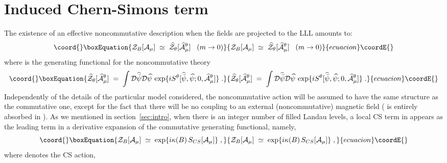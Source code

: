 \documentclass[a4paper,12pt]{article}
\begin{document}
\section{Induced Chern-Simons term}\label{sec:ics}
The existence of an effective noncommutative description when the
fields are projected to the LLL amounts to:
\begin{equation}\coord{}\boxEquation{
  \label{eq:zs}
  {\mathcal Z}_B[{\mathcal A}_\mu] \;\simeq\; 
\widehat{\mathcal Z}_\theta[{\widehat {\mathcal A}}^\theta_\mu] \;\;\;(m \to 0)  
}{
  {\mathcal Z}_B[{\mathcal A}_\mu] \;\simeq\; 
\widehat{\mathcal Z}_\theta[{\widehat {\mathcal A}}^\theta_\mu] \;\;\;(m \to 0)  
}{ecuacion}\coordE{}\end{equation}
where \coordHE{} is the
generating functional for the noncommutative theory 
\begin{equation}\coord{}\boxEquation{
  \label{eq:zncomm}
  \widehat{\mathcal Z}_\theta[{\widehat {\mathcal A}}^\theta_\mu]\;=\; 
\int {\mathcal D}{\widehat {\bar \psi}}
{\mathcal D}{\widehat \psi} \, \exp \{i S^\theta[{\widehat{\bar \psi}},
{\widehat \psi};0,{\widehat {\mathcal A}}^\theta_\mu] \}     \;.
}{
  \widehat{\mathcal Z}_\theta[{\widehat {\mathcal A}}^\theta_\mu]\;=\; 
\int {\mathcal D}{\widehat {\bar \psi}}
{\mathcal D}{\widehat \psi} \, \exp \{i S^\theta[{\widehat{\bar \psi}},
{\widehat \psi};0,{\widehat {\mathcal A}}^\theta_\mu] \}     \;.
}{ecuacion}\coordE{}\end{equation}
Independently of the details of the particular model considered, the
noncommutative action will be assumed to have the same structure as
the commutative one, except for the fact that there will be no
coupling to an external (noncommutative) magnetic field (\coordHE{} is
entirely absorbed in \myHighlight{$\theta$}\coordHE{}).  As we mentioned in
section~\ref{sec:intro}, when there is an integer number of filled
Landau levels, a local CS term in \coordHE{} appears as the
leading term in a derivative expansion of the commutative generating
functional, namely,
\begin{equation}\coord{}\boxEquation{
  \label{eq:zcexp}
  {\mathcal Z}_B[{\mathcal A}_\mu]\;\simeq\;\exp \{i \kappa(B) \, S_{CS}[{\mathcal A}_\mu] \} \;,
}{
  {\mathcal Z}_B[{\mathcal A}_\mu]\;\simeq\;\exp \{i \kappa(B) \, S_{CS}[{\mathcal A}_\mu] \} \;,
}{ecuacion}\coordE{}\end{equation} 
where \coordHE{} denotes the CS action,
\end{document}
